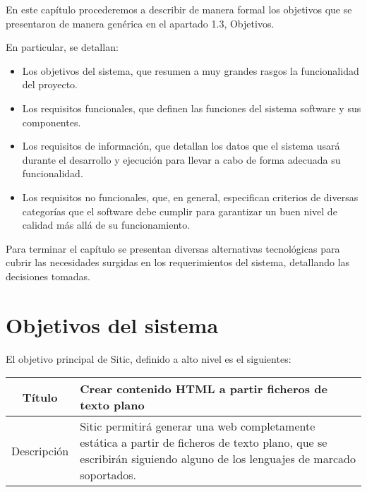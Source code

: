 En este capítulo procederemos a describir de manera formal los objetivos que se
presentaron de manera genérica en el apartado 1.3, Objetivos.

En particular, se detallan:

\begin{itemize}
\item Los objetivos del sistema, que resumen a muy grandes rasgos la funcionalidad del proyecto.
\item Los requisitos funcionales, que definen las funciones del sistema software
y sus componentes.
\item Los requisitos de información, que detallan los datos que el sistema usará
durante el desarrollo y ejecución para llevar a cabo de forma adecuada su
funcionalidad.
\item Los requisitos no funcionales, que, en general, especifican criterios de diversas
categorías que el software debe cumplir para garantizar un buen nivel
de calidad más allá de su funcionamiento.
\end{itemize}

Para terminar el capítulo se presentan diversas alternativas tecnológicas para cubrir
las necesidades surgidas en los requerimientos del sistema, detallando las
decisiones tomadas.


\section{Objetivos del sistema}

El objetivo principal de Sitic, definido a alto nivel es el siguientes:

\begin{center}

    \begin{tabularx}{\textwidth}{|c|X|}
        \hline
        Título & Crear contenido HTML a partir ficheros de texto plano\\

        \hline

        Descripción & Sitic permitirá generar una web completamente estática a partir
        de ficheros de texto plano, que se escribirán siguiendo alguno de los lenguajes de
        marcado soportados. \\

        \hline
    \end{tabularx}
\end{center}

